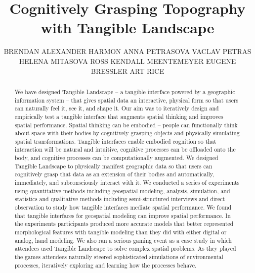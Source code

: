 \documentclass[prodmode,acmtochi]{acmsmall} %
\begin{document}

\title{Cognitively Grasping Topography with Tangible Landscape} 
% 
\author{BRENDAN ALEXANDER HARMON
ANNA PETRASOVA
VACLAV PETRAS
HELENA MITASOVA
ROSS ​KENDALL MEENTEMEYER
EUGENE BRESSLER
ART RICE
}

\begin{abstract}
%
We have designed Tangible Landscape -- a tangible interface powered by a geographic information system -- 
that gives spatial data an interactive, physical form so that users can naturally feel it, see it, and shape it.
%
Our aim was to iteratively design and empirically test a tangible interface that augments spatial thinking and improves spatial performance. 
%
Spatial thinking can be embodied -- people can functionally think about space with their bodies by cognitively grasping objects and physically simulating spatial transformations.
%
Tangible interfaces enable embodied cognition so that 
interaction will be natural and intuitive,
cognitive processes can be offloaded onto the body,
and cognitive processes can be computationally augmented.
%
We designed Tangible Landscape to physically manifest geographic data %
so that users can cognitively grasp that data as an extension of their bodies 
and automatically, immediately, and subconsciously interact with it. 
%
We conducted a series of experiments using quantitative methods including geospatial modeling, analysis, simulation, and statistics and qualitative methods including semi-structured interviews and direct observation
to study how tangible interfaces mediate spatial performance. 
%
We found that tangible interfaces for geospatial modeling 
can improve spatial performance.
%
In the experiments participants produced more accurate models 
that better represented morphological features 
with tangible modeling than they did with either digital or analog, hand modeling. 
%
We also ran a serious gaming event as a case study
in which attendees used Tangible Landscape to solve complex spatial problems. 
%
As they played the games
attendees naturally steered sophisticated simulations of environmental processes,
iteratively exploring and learning how the processes behave. 
%
\end{abstract}
\end{document}
